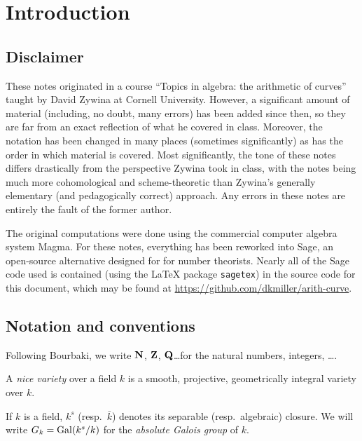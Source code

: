 

\section{Introduction}


\subsection{Disclaimer}

These notes originated in a course ``Topics in algebra: the arithmetic of 
curves'' taught by David Zywina at Cornell University. However, a significant 
amount of material (including, no 
doubt, many errors) has been added since then, so they are far from an exact 
reflection of what he covered in class. Moreover, the notation has been changed 
in many places (sometimes significantly) as has the order in which material is 
covered. Most significantly, the tone of these notes differs drastically 
from the perspective Zywina took in class, with the notes being much more 
cohomological and scheme-theoretic than Zywina's generally elementary (and 
pedagogically correct) approach. Any errors in these notes are entirely the 
fault of the former author. 

The original computations were done using the commercial 
computer algebra system Magma. For these notes, everything has been reworked 
into Sage, an open-source alternative designed for for number theorists. Nearly 
all of the Sage code used is contained (using the \LaTeX{} package 
\texttt{sagetex}) in the source code for this document, which may be found at 
\url{https://github.com/dkmiller/arith-curve}. 





\subsection{Notation and conventions}

Following Bourbaki, we write $\mathbf{N}$, $\mathbf{Z}$, $\mathbf{Q}$\ldots for the natural 
numbers, integers, \ldots. 

A \emph{nice variety} over a field $k$ is a smooth, projective, geometrically 
integral variety over $k$. 

If $k$ is a field, $k^s$ (resp.~$\bar k$) denotes its separable 
(resp.~algebraic) closure. We will write $G_k = \operatorname{Gal}(k^s/k)$ for the 
\emph{absolute Galois group} of $k$. 

